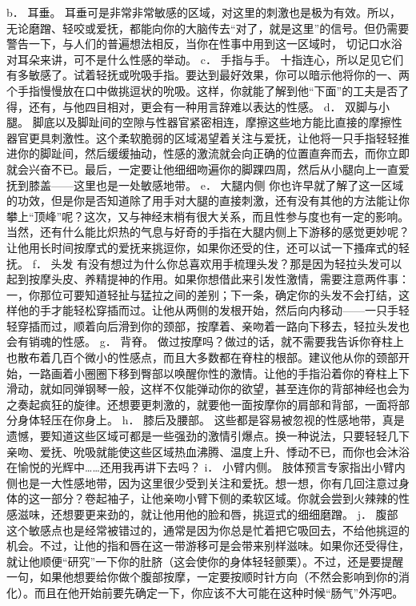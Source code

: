 \documentclass[12pt,UTF8]{ctexbook}
\begin{document}
b． 耳垂。
耳垂可是非常非常敏感的区域，对这里的刺激也是极为有效。所以，无论磨蹭、轻咬或爱抚，都能向你的大脑传去“对了，就是这里”的信号。但仍需要警告一下，与人们的普遍想法相反，当你在性事中用到这一区域时， 切记口水浴对耳朵来讲，可不是什么性感的举动。
c． 手指与手。
十指连心，所以足见它们有多敏感了。试着轻抚或吮吸手指。要达到最好效果，你可以暗示他将你的一、两个手指慢慢放在口中做挑逗状的吮吸。这样，你就能了解到他“下面”的工夫是否了得，还有，与他四目相对，更会有一种用言辞难以表达的性感。
d． 双脚与小腿。
脚底以及脚趾间的空隙与性器官紧密相连，摩擦这些地方能比直接的摩擦性器官更具刺激性。这个柔软脆弱的区域渴望着关注与爱抚，让他将一只手指轻轻推进你的脚趾间，然后缓缓抽动，性感的激流就会向正确的位置直奔而去，而你立即就会兴奋不已。最后，一定要让他细细吻遍你的脚踝四周，然后从小腿向上一直爱抚到膝盖——这里也是一处敏感地带。
e． 大腿内侧
你也许早就了解了这一区域的功效，但是你是否知道除了用手对大腿的直接刺激，还有没有其他的方法能让你攀上“顶峰”呢？这次，又与神经末梢有很大关系，而且性参与度也有一定的影响。当然，还有什么能比炽热的气息与好奇的手指在大腿内侧上下游移的感觉更妙呢？让他用长时间按摩式的爱抚来挑逗你，如果你还受的住，还可以试一下搔痒式的轻抚。
f． 头发
有没有想过为什么你总喜欢用手梳理头发？那是因为轻拉头发可以起到按摩头皮、养精提神的作用。如果你想借此来引发性激情，需要注意两件事：一，你那位可要知道轻扯与猛拉之间的差别；下一条，确定你的头发不会打结，这样他的手才能轻松穿插而过。让他从两侧的发根开始，然后向内移动——一只手轻轻穿插而过，顺着向后滑到你的颈部，按摩着、亲吻着一路向下移去，轻拉头发也会有销魂的性感。
g． 背脊。
做过按摩吗？做过的话，就不需要我告诉你脊柱上也散布着几百个微小的性感点，而且大多数都在脊柱的根部。建议他从你的颈部开始，一路画着小圈圈下移到臀部以唤醒你性的激情。让他的手指沿着你的脊柱上下滑动，就如同弹钢琴一般，这样不仅能弹动你的欲望，甚至连你的背部神经也会为之奏起疯狂的旋律。还想要更刺激的，就要他一面按摩你的肩部和背部，一面将部分身体轻压在你身上。
h． 膝后及腰部。
这些都是容易被忽视的性感地带，真是遗憾，要知道这些区域可都是一些强劲的激情引爆点。换一种说法，只要轻轻几下亲吻、爱抚、吮吸就能使这些区域热血沸腾、温度上升、悸动不已，而你也会沐浴在愉悦的光辉中……还用我再讲下去吗？
i． 小臂内侧。
肢体预言专家指出小臂内侧也是一大性感地带，因为这里很少受到关注和爱抚。想一想，你有几回注意过身体的这一部分？卷起袖子，让他亲吻小臂下侧的柔软区域。你就会尝到火辣辣的性感滋味，还想要更来劲的，就让他用他的脸和唇，挑逗式的细细磨蹭。
j． 腹部
这个敏感点也是经常被错过的，通常是因为你总是忙着把它吸回去，不给他挑逗的机会。不过，让他的指和唇在这一带游移可是会带来别样滋味。如果你还受得住，就让他顺便“研究”一下你的肚脐（这会使你的身体轻轻颤栗）。不过，还是要提醒一句，如果他想要给你做个腹部按摩，一定要按顺时针方向（不然会影响到你的消化）。而且在他开始前要先确定一下，你应该不大可能在这种时候“肠气”外泻吧。
\end{document}
